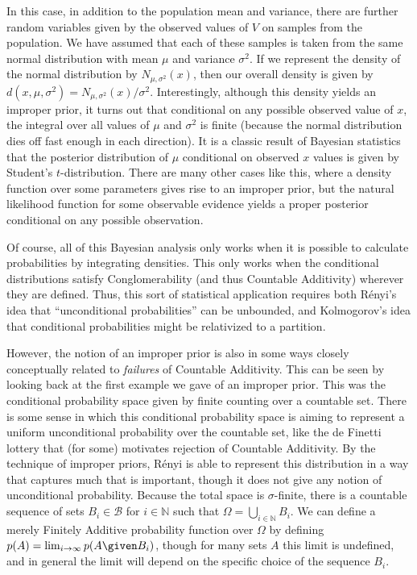 In this case, in addition to the population mean and variance, there are further random variables given by the observed values of $V$ on samples from the population. We have assumed that each of these samples is taken from the same normal distribution with mean $\mu$ and variance $\sigma^2$. If we represent the density of the normal distribution by $N_{\mu,\sigma^2}(x)$, then our overall density is given by $d(x,\mu,\sigma^2)=N_{\mu,\sigma^2}(x)/\sigma^2$. Interestingly, although this density yields an improper prior, it turns out that conditional on any possible observed value of $x$, the integral over all values of $\mu$ and $\sigma^2$ is finite (because the normal distribution dies off fast enough in each direction). It is a classic result of Bayesian statistics that the posterior distribution of $\mu$ conditional on observed $x$ values is given by Student's $t$-distribution. There are many other cases like this, where a density function over some parameters gives rise to an improper prior, but the natural likelihood function for some observable evidence yields a proper posterior conditional on any possible observation.

Of course, all of this Bayesian analysis only works when it is possible to calculate probabilities by integrating densities. This only works when the conditional distributions satisfy Conglomerability (and thus Countable Additivity) wherever they are defined. Thus, this sort of statistical application requires both R\'{e}nyi's idea that ``unconditional probabilities'' can be unbounded, and Kolmogorov's idea that conditional probabilities might be relativized to a partition.

However, the notion of an improper prior is also in some ways closely conceptually related to \emph{failures} of Countable Additivity. This can be seen by looking back at the first example we gave of an improper prior. This was the conditional probability space given by finite counting over a countable set. There is some sense in which this conditional probability space is aiming to represent a uniform unconditional probability over the countable set, like the de Finetti lottery that (for some) motivates rejection of Countable Additivity. By the technique of improper priors, R\'{e}nyi is able to represent this distribution in a way that captures much that is important, though it does not give any notion of unconditional probability. Because the total space is $\sigma$-finite, there is a countable sequence of sets $B_i\in\mathcal{B}$ for $i\in\mathbb{N}$ such that $\Omega=\bigcup_{i\in\mathbb{N}}B_i$. We can define a merely Finitely Additive probability function over $\Omega$ by defining $p(A)=\lim_{i\to\infty}p(A \given B_i)$, though for many sets $A$ this limit is undefined, and in general the limit will depend on the specific choice of the sequence $B_i$.

